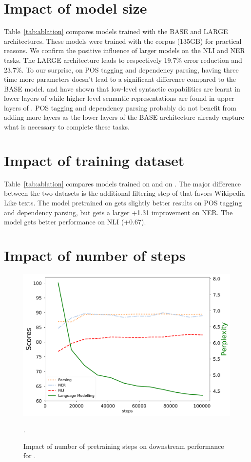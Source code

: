 \section{Impact of model size}
Table~\ref{tab:ablation} compares models trained with the BASE and LARGE architectures.
These models were trained with the \ccnet corpus (135GB) for practical reasons.
We confirm the positive influence of larger models on the NLI and NER tasks. The LARGE architecture leads to respectively 19.7\% error reduction and 23.7\%.
To our surprise, on POS tagging and dependency parsing, having three time more parameters doesn't lead to a significant  difference compared to the BASE model.
 and  have shown that low-level syntactic capabilities are learnt in lower layers of \bert while higher level semantic representations are found in upper layers of \bert.
POS tagging and dependency parsing probably do not benefit from adding more layers as the lower layers of the BASE architecture already capture what is necessary to complete these tasks.


\section{Impact of training dataset}

Table~\ref{tab:ablation} compares models trained on \ccnet and on \oscar.
The major difference between the two datasets is the additional filtering step of \ccnet that favors Wikipedia-Like texts.
The model pretrained on \oscar gets slightly better results on POS tagging and dependency parsing, but gets a larger +1.31 improvement on NER.
The \ccnet model gets better performance on NLI (+0.67).

\section{Impact of number of steps}
\label{sec:nbsteps}

\begin{figure}[t]
    \centering
    \includegraphics[width=\linewidth]{static/media/mod_eval/camembert/plot_steps_impact_4.pdf}
    \caption{Impact of number of pretraining steps on downstream performance for \camembert.}.
    \label{fig:n_steps_impact}
\end{figure}


